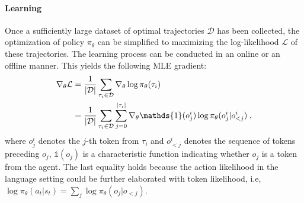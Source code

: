\paragraph{Learning}
Once a sufficiently large dataset of optimal trajectories $\mathcal{D}$ has been collected, the optimization of policy $\pi_\theta$ can be simplified to maximizing the log-likelihood $\mathcal{L}$ of these trajectories.
The learning process can be conducted in an online or an offline manner.
This yields the following MLE gradient:
\begin{align}
\label{eq_8}
    \nabla_\theta \mathcal{L} &=\frac{1}{|\mathcal{D}|}\sum_{\tau_i \in \mathcal{D}} \nabla_\theta \log \pi_\theta (\tau_i) \notag \\
    &= \frac{1}{|\mathcal{D}|}\sum_{\tau_i \in \mathcal{D}}
      \sum_{j=0}^{|\tau_i|} \nabla_\theta \mathds{1}(o_j^i) \log \pi_\theta (o_j^i | o_{<j}^i) \; ,
\end{align}
where $o_j^i$ denotes the $j$-th token from $\tau_i$ and $o_{<j}^i$ denotes the sequence of tokens preceding $o_j$, $\mathds{1}(o_j)$ is a characteristic function indicating whether $o_j$ is a token from the agent.
The last equality holds because the action likelihood in the language setting could be further elaborated with token likelihood, i.e, $\log \pi_\theta (a_t | s_t) = \sum_j \log \pi_\theta (o_j | o_{<j})$.

